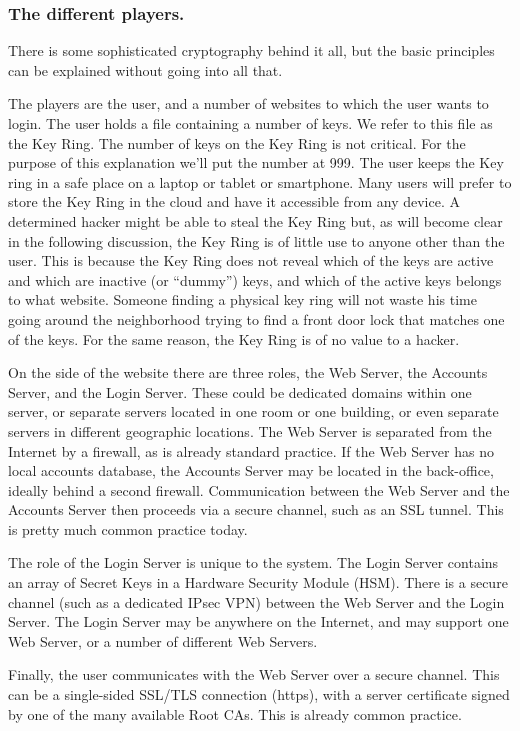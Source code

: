 \subsubsection{The different players.}
There is some sophisticated cryptography behind it all, but the basic principles can be explained without going into all that.
\par
The players are the user, and a number of websites to which the user wants to login.
The user holds a file containing a number of keys.
We refer to this file as the Key Ring.
The number of keys on the Key Ring is not critical.
For the purpose of this explanation we'll put the number at 999.
The user keeps the Key ring in a safe place on a laptop or tablet or smartphone.
Many users will prefer to store the Key Ring in the cloud and have it accessible from any device.
A determined hacker might be able to steal the Key Ring but, as will become clear in the following discussion, the Key Ring is of little use to anyone other than the user.
This is because the Key Ring does not reveal which of the keys are active and which are inactive (or ``dummy'') keys, and which of the active keys belongs to what website.
Someone finding a physical key ring will not waste his time going around the neighborhood trying to find a front door lock that matches one of the keys.
For the same reason, the \TIMO Key Ring is of no value to a hacker.
\par
On the side of the website there are three roles, the Web Server, the Accounts Server, and the Login Server.
These could be dedicated domains within one server, or separate servers located in one room or one building, or even separate servers in different geographic locations.
The Web Server is separated from the Internet by a firewall, as is already standard practice.
If the Web Server has no local accounts database, the Accounts Server may be located in the back-office, ideally behind a second firewall.
Communication between the Web Server and the Accounts Server then proceeds via a secure channel, such as an SSL tunnel.
This is pretty much common practice today.
\par
The role of the Login Server is unique to the \TIMO system.
The Login Server contains an array of Secret Keys in a Hardware Security Module (HSM).
There is a secure channel (such as a dedicated IPsec VPN) between the Web Server and the Login Server.
The Login Server may be anywhere on the Internet, and may support one Web Server, or a number of different Web Servers.
\par
Finally, the user communicates with the Web Server over a secure channel.
This can be a single-sided SSL/TLS connection (https), with a server certificate signed by one of the many available Root CAs.
This is already common practice.
%
